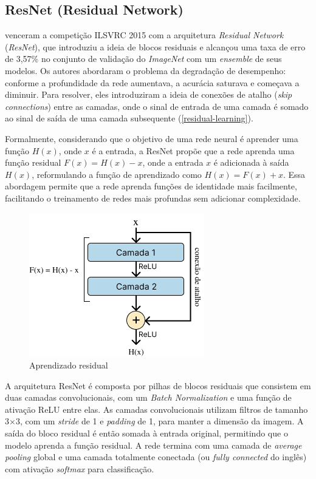 \subsection{ResNet (Residual Network)}

\cite{He2016} venceram a competição ILSVRC 2015 com a arquitetura \textit{Residual Network} (\textit{ResNet}), que introduziu a ideia de blocos residuais e alcançou uma taxa de erro de 3,57\% no conjunto de validação do \textit{ImageNet} com um \textit{ensemble} de seus modelos. Os autores abordaram o problema da degradação de desempenho: conforme a profundidade da rede aumentava, a acurácia saturava e começava a diminuir. Para resolver, eles introduziram a ideia de conexões de atalho (\textit{skip connections}) entre as camadas, onde o sinal de entrada de uma camada é somado ao sinal de saída de uma camada subsequente (\autoref{residual-learning}).

Formalmente, considerando que o objetivo de uma rede neural é aprender uma função \( H(x) \), onde \( x \) é a entrada, a ResNet propõe que a rede aprenda uma função residual \( F(x) = H(x) - x \), onde a entrada \( x \) é adicionada à saída \( H(x) \), reformulando a função de aprendizado como \( H(x) = F(x) + x \). Essa abordagem permite que a rede aprenda funções de identidade mais facilmente, facilitando o treinamento de redes mais profundas sem adicionar complexidade.

\begin{figure}[h]
    \centering
    \includegraphics[width=0.5\linewidth]{figs/residual-connection.png}
    \caption{Aprendizado residual}
    \label{residual-learning}
\end{figure}

A arquitetura ResNet é composta por pilhas de blocos residuais que consistem em duas camadas convolucionais, com um \textit{Batch Normalization} e uma função de ativação ReLU entre elas. As camadas convolucionais utilizam filtros de tamanho 3×3, com um \textit{stride} de 1 e \textit{padding} de 1, para manter a dimensão da imagem. A saída do bloco residual é então somada à entrada original, permitindo que o modelo aprenda a função residual. A rede termina com uma camada de \textit{average pooling} global e uma camada totalmente conectada (ou \textit{fully connected} do inglês) com ativação \textit{softmax} para classificação.

